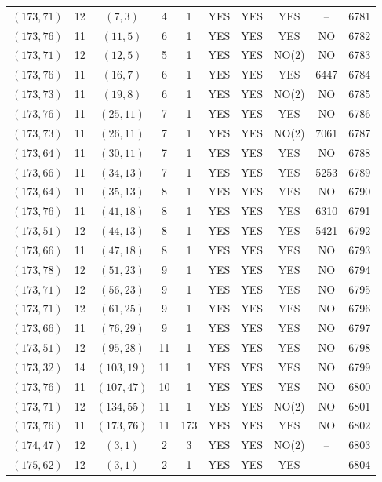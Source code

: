 \begin{longtable}{|c|c|c|c|c|c|c|c|c|c|}
$(173, 71)$ & 12 & $(7, 3)$ & 4 & 1 & YES & YES & YES & -- & 6781\\
$(173, 76)$ & 11 & $(11, 5)$ & 6 & 1 & YES & YES & YES & NO & 6782\\
$(173, 71)$ & 12 & $(12, 5)$ & 5 & 1 & YES & YES & NO(2) & NO & 6783\\
$(173, 76)$ & 11 & $(16, 7)$ & 6 & 1 & YES & YES & YES & 6447 & 6784\\
$(173, 73)$ & 11 & $(19, 8)$ & 6 & 1 & YES & YES & NO(2) & NO & 6785\\
$(173, 76)$ & 11 & $(25, 11)$ & 7 & 1 & YES & YES & YES & NO & 6786\\
$(173, 73)$ & 11 & $(26, 11)$ & 7 & 1 & YES & YES & NO(2) & 7061 & 6787\\
$(173, 64)$ & 11 & $(30, 11)$ & 7 & 1 & YES & YES & YES & NO & 6788\\
$(173, 66)$ & 11 & $(34, 13)$ & 7 & 1 & YES & YES & YES & 5253 & 6789\\
$(173, 64)$ & 11 & $(35, 13)$ & 8 & 1 & YES & YES & YES & NO & 6790\\
$(173, 76)$ & 11 & $(41, 18)$ & 8 & 1 & YES & YES & YES & 6310 & 6791\\
$(173, 51)$ & 12 & $(44, 13)$ & 8 & 1 & YES & YES & YES & 5421 & 6792\\
$(173, 66)$ & 11 & $(47, 18)$ & 8 & 1 & YES & YES & YES & NO & 6793\\
$(173, 78)$ & 12 & $(51, 23)$ & 9 & 1 & YES & YES & YES & NO & 6794\\
$(173, 71)$ & 12 & $(56, 23)$ & 9 & 1 & YES & YES & YES & NO & 6795\\
$(173, 71)$ & 12 & $(61, 25)$ & 9 & 1 & YES & YES & YES & NO & 6796\\
$(173, 66)$ & 11 & $(76, 29)$ & 9 & 1 & YES & YES & YES & NO & 6797\\
$(173, 51)$ & 12 & $(95, 28)$ & 11 & 1 & YES & YES & YES & NO & 6798\\
$(173, 32)$ & 14 & $(103, 19)$ & 11 & 1 & YES & YES & YES & NO & 6799\\
$(173, 76)$ & 11 & $(107, 47)$ & 10 & 1 & YES & YES & YES & NO & 6800\\
$(173, 71)$ & 12 & $(134, 55)$ & 11 & 1 & YES & YES & NO(2) & NO & 6801\\
$(173, 76)$ & 11 & $(173, 76)$ & 11 & 173 & YES & YES & YES & NO & 6802\\
$(174, 47)$ & 12 & $(3, 1)$ & 2 & 3 & YES & YES & NO(2) & -- & 6803\\
$(175, 62)$ & 12 & $(3, 1)$ & 2 & 1 & YES & YES & YES & -- & 6804\\

\end{longtable}
